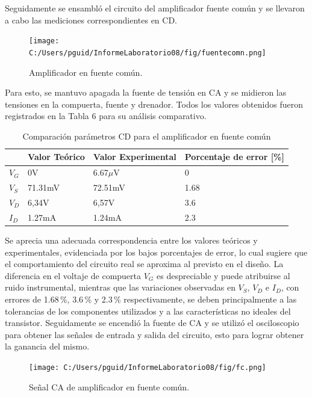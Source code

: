 \documentclass[journal]{IEEEtran}
\begin{document}
\par Seguidamente se ensambló el circuito del amplificador fuente común y se llevaron a cabo las mediciones correspondientes en CD.
\begin{figure}[H]
    \centering
    \texttt{[image: C:/Users/pguid/InformeLaboratorio08/fig/fuentecomn.png]}
    \caption{Amplificador en fuente común.}
    \label{fig:amplificador_fuente_común}
\end{figure}
\par Para esto, se mantuvo apagada la fuente de tensión en CA y se midieron las tensiones en la compuerta, fuente y drenador. Todos los valores obtenidos fueron registrados en la Tabla 6 para su análisis comparativo.
\begin{table}[h]
    \caption{Comparación parámetros CD para el amplificador en fuente común}
    \centering
    \renewcommand{\arraystretch}{1.2} %
    \begin{tabular}{|l|p{2cm}|p{2cm}|p{2cm}|}
        \hline
        & \textbf{Valor Teórico} & \textbf{Valor Experimental} & \textbf{Porcentaje de error [\%]} \\
        \hline
        \( V_G \) & 0V  & 6.67$\mu$V  & 0 \\
        \hline
        \( V_S \) & 71.31mV   & 72.51mV  & 1.68 \\
        \hline
        \( V_D \) & 6,34V & 6,57V & 3.6 \\
        \hline
        \( I_D \) & 1.27mA & 1.24mA & 2.3 \\
        \hline
    \end{tabular}
    \label{tab:circuito2}
\end{table}
\par Se aprecia una adecuada correspondencia entre los valores teóricos y experimentales, evidenciada por los bajos porcentajes de error, lo cual sugiere que el comportamiento del circuito real se aproxima al previsto en el diseño. La diferencia en el voltaje de compuerta \( V_G \) es despreciable y puede atribuirse al ruido instrumental, mientras que las variaciones observadas en \( V_S \), \( V_D \) e \( I_D \), con errores de 1.68\,\%, 3.6\,\% y 2.3\,\% respectivamente, se deben principalmente a las tolerancias de los componentes utilizados y a las características no ideales del transistor.
Seguidamente se encendió la fuente de CA y se utilizó el osciloscopio para obtener las señales de entrada y salida del circuito, esto para lograr obtener la ganancia del mismo.
\begin{figure}[H]
    \centering
    \texttt{[image: C:/Users/pguid/InformeLaboratorio08/fig/fc.png]}
    \caption{Señal CA de amplificador en fuente común.}
    \label{fig:amplificador_fuente_común}
\end{figure}
\end{document}
